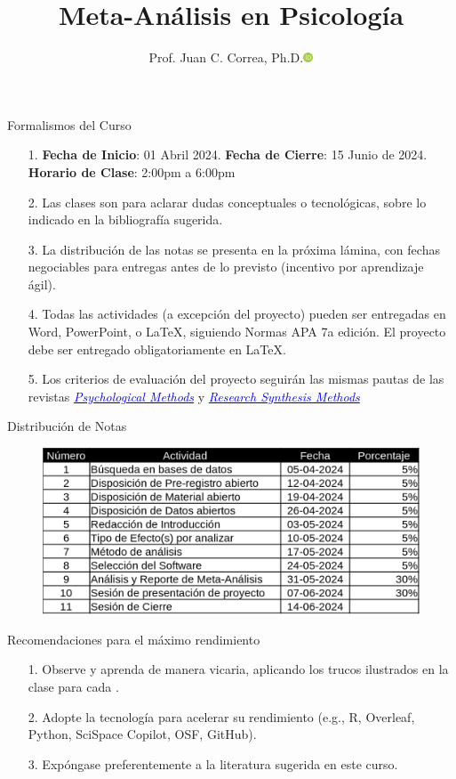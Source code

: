 \documentclass[aspectratio=169]{beamer}
\title[Meta-Análisis en Psicología]{Meta-Análisis en Psicología}
\author[Juan C. Correa (\url{https://correajc.com/})]{Prof. Juan C. Correa, Ph.D.\href{https://orcid.org/0000-0002-0301-5641}{\includegraphics[width=0.3cm]{orcid.png}}}
\institute[]{
Doctorado en Psicología\\
Universidad de La Sabana\\
\Email  \href{mailto:juancn@unisabana.edu.co}{\color{blue}juancn@unisabana.edu.co}
}
\date[Bogotá, 5 de Abril de 2024] %
{}
\begin{document}
\begin{frame}
\titlepage
\end{frame}

\begin{frame}{Formalismos del Curso}
\begin{itemize}
\item[1.] \textbf{Fecha de Inicio}: 01 Abril 2024. \textbf{Fecha de Cierre}: 15 Junio de 2024. \textbf{Horario de Clase}: 2:00pm a 6:00pm
\item[2.] Las clases son para aclarar dudas conceptuales o tecnológicas, sobre lo indicado en la bibliografía sugerida.
\item[3.] La distribución de las notas se presenta en la próxima lámina, con fechas negociables para entregas antes de lo previsto (incentivo por aprendizaje ágil).
\item[4.] Todas las actividades (a excepción del proyecto) pueden ser entregadas en Word, PowerPoint, o \LaTeX, siguiendo Normas APA 7a edición. El proyecto debe ser entregado obligatoriamente en \LaTeX.
\item[5.]  Los criterios de evaluación del proyecto seguirán las mismas pautas de las revistas \href{https://www.apa.org/pubs/journals/special/2272006}{\textcolor{blue}{\textit{Psychological Methods}}} y \href{https://onlinelibrary.wiley.com/page/journal/17592887/homepage/forauthors.html}{\textcolor{blue}{\textit{Research Synthesis Methods}}}
\end{itemize}    
\end{frame}

\begin{frame}{Distribución de Notas}
\begin{figure}
\centering
\includegraphics[width=0.7\linewidth]{Notas.png}
\end{figure}
\end{frame}

\begin{frame}{Recomendaciones para el máximo rendimiento}
\begin{itemize}
\item[1.] Observe y aprenda de manera vicaria, aplicando los trucos ilustrados en la clase para cada .
\item[2.] Adopte la tecnología para acelerar su rendimiento (e.g., R, Overleaf, Python, SciSpace Copilot, OSF, GitHub).
\item[3.] Expóngase preferentemente a la literatura sugerida en este curso.
\end{itemize}
\end{frame}
\end{document}
